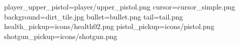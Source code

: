 player_upper_pistol=player/upper_pistol.png
cursor=cursor_simple.png
background=dirt_tile.jpg
bullet=bullet.png
tail=tail.png
health_pickup=icons/health02.png
pistol_pickup=icons/pistol.png
shotgun_pickup=icons/shotgun.png
